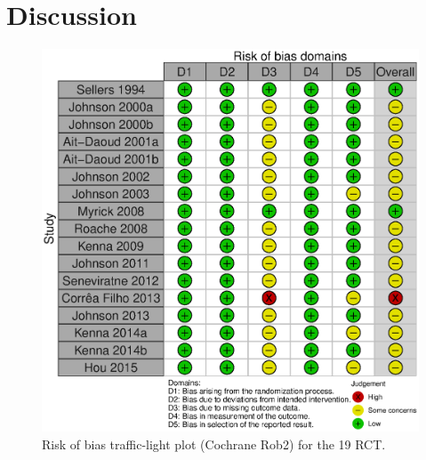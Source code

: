 \documentclass{article}
\begin{document}
\section*{Discussion}


\renewcommand{\refname}{\spacedlowsmallcaps{References}} %



\newpage






\begin{figure}[t!]
\includegraphics[width=\columnwidth]{pictures/ROB2.eps}
\caption{Risk of bias traffic-light plot (Cochrane Rob2) for the 19 RCT.}
\label{fig:trafficlight}
\end{figure}

\end{document}
